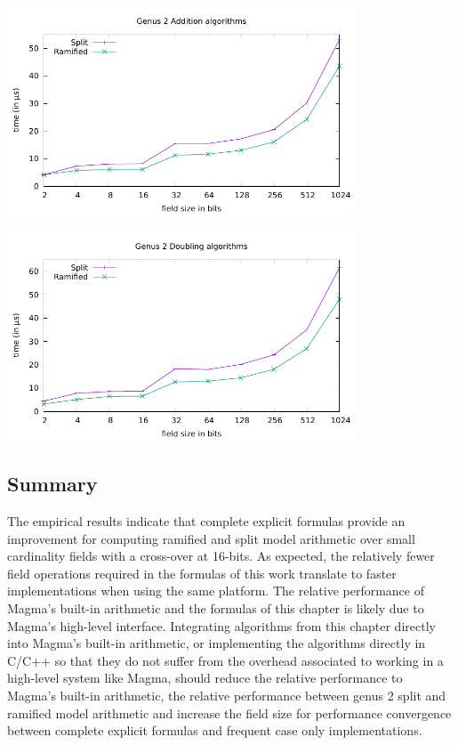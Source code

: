 \centerline{\includegraphics[width=0.775\textwidth]{genus2/g2_G4_ADD.pdf}}
\centerline{\includegraphics[width=0.775\textwidth]{genus2/g2_G4_DBL.pdf}}

\subsection{Summary}

The empirical results indicate that complete explicit formulas provide an
improvement for computing ramified and split model arithmetic over small
cardinality fields with a cross-over at 16-bits.  As expected, the relatively
fewer field operations required in the formulas of this work translate to faster
implementations when using the same platform. The relative performance of
Magma's built-in arithmetic and the formulas of this chapter is likely due to
Magma's high-level interface. Integrating algorithms from this chapter directly
into Magma's built-in arithmetic, or implementing the algorithms directly in
C/C++ so that they do not suffer from the overhead associated to working in a
high-level system like Magma, should reduce the relative performance to Magma's
built-in arithmetic, the relative performance between genus 2 split and ramified
model arithmetic and increase the field size for performance convergence between
complete explicit formulas and frequent case only implementations.




